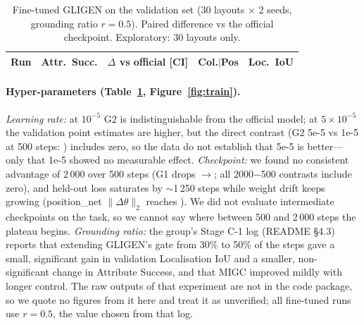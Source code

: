 \documentclass[10pt,twocolumn]{article}
\begin{document}
\begin{table}[t]
\centering\small
\caption{Fine-tuned GLIGEN on the validation set (30 layouts $\times$ 2 seeds, grounding ratio $r{=}0.5$). Paired difference vs the official checkpoint. Exploratory: 30 layouts only.}
\label{tab:ft}
\setlength{\tabcolsep}{3pt}
\begin{tabular}{@{}lrlrr@{}}
\toprule
Run & Attr.\ Succ. & $\Delta$ vs official [CI] & Col.$|$Pos & Loc.\ IoU \\ \midrule

\end{tabular}
\end{table}

\paragraph{Hyper-parameters (Table~\ref{tab:ft}, Figure~\ref{fig:train}).} \emph{Learning rate:} at $10^{-5}$ G2 is indistinguishable from the official model; at $5{\times}10^{-5}$ the validation point estimates are higher, but the direct contrast (G2 5e-5 vs 1e-5 at 500 steps: \LrContrast) includes zero, so the data do not establish that 5e-5 is better---only that 1e-5 showed no measurable effect. \emph{Checkpoint:} we found no consistent advantage of 2\,000 over 500 steps (G1 drops \GoneFiveHundred$\to$\GoneTwoThousand; all 2000$-$500 contrasts include zero), and held-out loss saturates by $\sim$1\,250 steps while weight drift keeps growing (position\_net $\|\Delta\theta\|_2$ reaches \PosNetDrift). We did not evaluate intermediate checkpoints on the task, so we cannot say where between 500 and 2\,000 steps the plateau begins. \emph{Grounding ratio:} the group's Stage C-1 log (README \S4.3) reports that extending GLIGEN's gate from 30\% to 50\% of the steps gave a small, significant gain in validation Localisation IoU and a smaller, non-significant change in Attribute Success, and that MIGC improved mildly with longer control. The raw outputs of that experiment are not in the code package, so we quote no figures from it here and treat it as unverified; all fine-tuned runs use $r{=}0.5$, the value chosen from that log.
\end{document}
